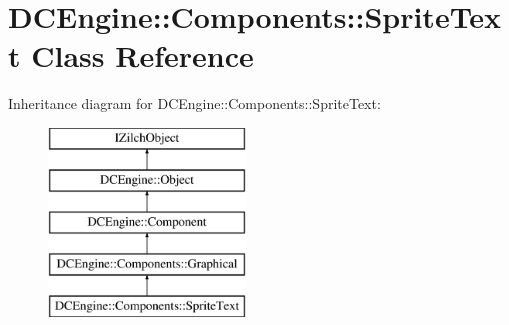 \hypertarget{classDCEngine_1_1Components_1_1SpriteText}{\section{D\-C\-Engine\-:\-:Components\-:\-:Sprite\-Text Class Reference}
\label{classDCEngine_1_1Components_1_1SpriteText}
}
Inheritance diagram for D\-C\-Engine\-:\-:Components\-:\-:Sprite\-Text\-:\begin{figure}[H]
\begin{center}
\leavevmode
\includegraphics[height=5.000000cm]{classDCEngine_1_1Components_1_1SpriteText}
\end{center}
\end{figure}
